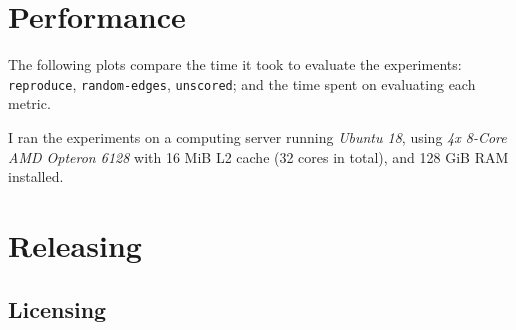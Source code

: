 \section{Performance}

The following plots compare the time it took to evaluate the experiments: \texttt{reproduce}, \texttt{random-edges}, \texttt{unscored}; and the time spent on evaluating each metric.

I ran the experiments on a computing server running \textsl{Ubuntu 18}, using \textsl{4x 8-Core AMD Opteron 6128} with 16 MiB L2 cache (32 cores in total), and 128 GiB RAM installed.




\section{Releasing \graffs}

\subsection{Licensing}

